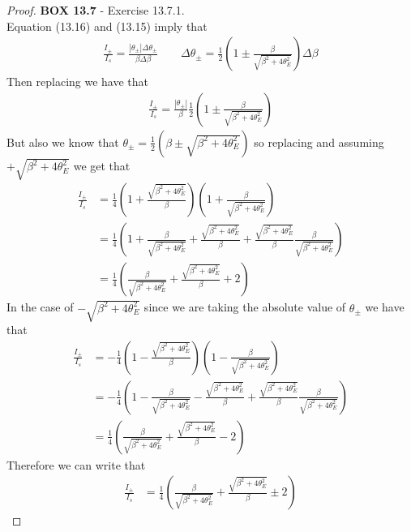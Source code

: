 \documentclass[11pt]{article}
\theoremstyle{definition}
\begin{document}
\cleardoublepage
\begin{proof}{\textbf{BOX 13.7} - Exercise 13.7.1.}\\
Equation (13.16) and (13.15) imply that
\begin{align*}
    \frac{I_{\pm}}{I_s} = \frac{|\theta_\pm|\Delta\theta_\pm}{\beta\Delta\beta}
    \qquad
    \Delta\theta_\pm = \frac{1}{2}\left(
        1 \pm \frac{\beta}{\sqrt{\beta^2 + 4\theta_E^2}}
    \right)\Delta\beta
\end{align*}
Then replacing we have that
\begin{align*}
    \frac{I_{\pm}}{I_s}
    = \frac{|\theta_\pm|}{\beta}\frac{1}{2}\left(
        1 \pm \frac{\beta}{\sqrt{\beta^2 + 4\theta_E^2}}
    \right)
\end{align*}
But also we know that $\theta_\pm = \frac{1}{2}(\beta \pm \sqrt{\beta^2 + 4 \theta_E^2})$
so replacing and assuming $+\sqrt{\beta^2 + 4\theta_E^2}$ we get that
\begin{align*}
    \frac{I_{\pm}}{I_s}
    &= \frac{1}{4}\left(1 + \frac{\sqrt{\beta^2 + 4 \theta_E^2}}{\beta}\right)
    \left(1 + \frac{\beta}{\sqrt{\beta^2 + 4\theta_E^2}}\right)\\
    &= \frac{1}{4}
    \left(
        1 + \frac{\beta}{\sqrt{\beta^2 + 4\theta_E^2}}
        + \frac{\sqrt{\beta^2 + 4 \theta_E^2}}{\beta}
        + \frac{\sqrt{\beta^2 + 4 \theta_E^2}}{\beta}
        \frac{\beta}{\sqrt{\beta^2 + 4\theta_E^2}}
    \right)\\
    &= \frac{1}{4}
    \left(
        \frac{\beta}{\sqrt{\beta^2 + 4\theta_E^2}}
        + \frac{\sqrt{\beta^2 + 4 \theta_E^2}}{\beta} + 2
    \right)
\end{align*}
In the case of $-\sqrt{\beta^2 + 4\theta_E^2}$ since we are taking
the absolute value of $\theta_\pm$ we have that
\begin{align*}
    \frac{I_{\pm}}{I_s}
    &= -\frac{1}{4}\left(1 - \frac{\sqrt{\beta^2 + 4 \theta_E^2}}{\beta}\right)
    \left(1 - \frac{\beta}{\sqrt{\beta^2 + 4\theta_E^2}}\right)\\
    &= -\frac{1}{4}
    \left(
        1 - \frac{\beta}{\sqrt{\beta^2 + 4\theta_E^2}}
        - \frac{\sqrt{\beta^2 + 4 \theta_E^2}}{\beta}
        + \frac{\sqrt{\beta^2 + 4 \theta_E^2}}{\beta}
        \frac{\beta}{\sqrt{\beta^2 + 4\theta_E^2}}
    \right)\\
    &= \frac{1}{4}
    \left(
        \frac{\beta}{\sqrt{\beta^2 + 4\theta_E^2}}
        + \frac{\sqrt{\beta^2 + 4 \theta_E^2}}{\beta} - 2
    \right)
\end{align*}
Therefore we can write that
\begin{align*}
    \frac{I_{\pm}}{I_s}
    &= \frac{1}{4}
    \left(\frac{\beta}{\sqrt{\beta^2 + 4\theta_E^2}}
    + \frac{\sqrt{\beta^2 + 4 \theta_E^2}}{\beta} \pm 2\right)
\end{align*}
\end{proof}
\end{document}

